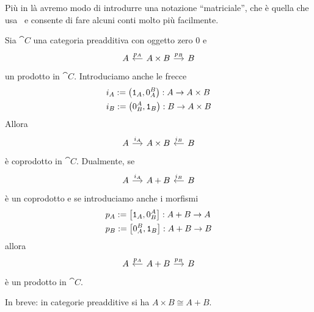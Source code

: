 Più in là avremo modo di introdurre una notazione ``matriciale'', che è
quella che usa~\cite{buehler:exactcategories} e consente di fare alcuni
conti molto più facilmente.

\begin{proposition}\label{proposition:BinProdsAreBinCoprods}
  Sia \(\cat C\) una categoria preadditiva con oggetto zero \(0\) e
  \[
    \begin{tikzcd}[column sep=small]
      A & A \times B \ar["{p_A}", l, swap] \ar["{p_B}", r] & B
    \end{tikzcd}
  \]
  un prodotto in \(\cat C\).  Introduciamo anche le frecce
  \begin{equation}
    \label{eq:InjViaProj}
    \begin{aligned}
      & i_A := \left( \mathtt 1_A, 0_A^B \right) : A \to A \times B \\
      & i_B := \left( 0_B^A, \mathtt 1_B \right) : B \to A \times B
    \end{aligned}
  \end{equation}
  Allora
  \[
    \begin{tikzcd}[column sep=small]
      A \ar["{i_A}", r] & A \times B & B \ar["{i_B}", l, swap]
    \end{tikzcd}
  \]
  è coprodotto in \(\cat C\). Dualmente, se
  \[
    \begin{tikzcd}[column sep=small]
      A \ar["{i_A}", r] & A + B & B \ar["{i_B}", l, swap]
    \end{tikzcd}
  \]
  è un coprodotto e se introduciamo anche i morfismi
  \begin{equation}
    \label{eq:ProjViaInj}
    \begin{aligned}
      & p_A := \left[ \mathtt 1_A, 0_B^A \right] : A + B \to A \\
      & p_B := \left[ 0_A^B, \mathtt 1_B \right] : A + B \to B
    \end{aligned}
  \end{equation}
  allora
  \[
    \begin{tikzcd}[column sep=small]
      A & A + B \ar["{p_A}", l, swap] \ar["{p_B}", r] & B
    \end{tikzcd}
  \]
  è un prodotto in \(\cat C\).
\end{proposition}

In breve: in categorie preadditive si ha \(A \times B \cong A+B\).

